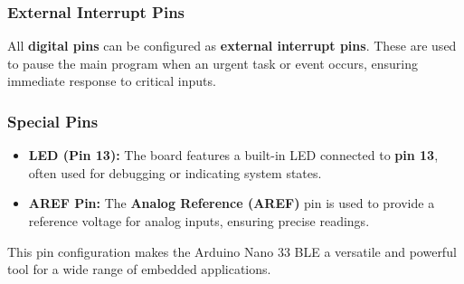 \subsubsection{External Interrupt Pins}
All \textbf{digital pins} can be configured as \textbf{external interrupt pins}. These are used to pause the main program when an urgent task or event occurs, ensuring immediate response to critical inputs.

\subsubsection{Special Pins}
\begin{itemize}
	\item \textbf{LED (Pin 13):} The board features a built-in LED connected to \textbf{pin 13}, often used for debugging or indicating system states.
	\item \textbf{AREF Pin:} The \textbf{Analog Reference (AREF)} pin is used to provide a reference voltage for analog inputs, ensuring precise readings.
\end{itemize}

This pin configuration makes the Arduino Nano 33 BLE a versatile and powerful tool for a wide range of embedded applications.